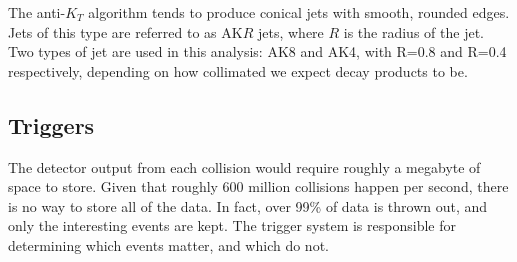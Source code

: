 The anti-$K_{T}$ algorithm tends to produce conical jets with smooth, rounded edges. Jets of this type are referred to as AK$R$ jets, where $R$ is the radius of the jet. Two types of jet are used in this analysis: AK8 and AK4, with R=0.8 and R=0.4 respectively, depending on how collimated we expect decay products to be.


\vspace{5mm}

\subsection{Triggers}
The detector output from each collision would require roughly a megabyte of space to store. Given that roughly 600 million collisions happen per second, there is no way to store all of the data. In fact, over 99\% of data is thrown out, and only the interesting events are kept. The trigger system is responsible for determining which events matter, and which do not.

